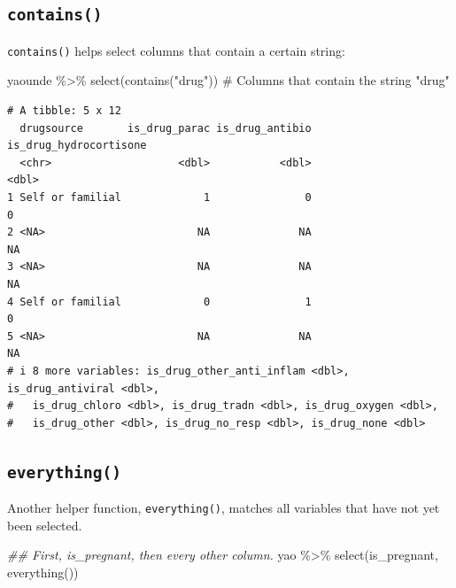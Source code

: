 \documentclass[
  letterpaper,
  DIV=11,
  numbers=noendperiod]{scrreprt}
\newenvironment{Shaded}{\begin{snugshade}}{\end{snugshade}}
\newcommand{\CommentTok}[1]{\textcolor[rgb]{0.37,0.37,0.37}{#1}}
\newcommand{\DocumentationTok}[1]{\textcolor[rgb]{0.37,0.37,0.37}{\textit{#1}}}
\newcommand{\FunctionTok}[1]{\textcolor[rgb]{0.28,0.35,0.67}{#1}}
\newcommand{\NormalTok}[1]{\textcolor[rgb]{0.00,0.23,0.31}{#1}}
\newcommand{\SpecialCharTok}[1]{\textcolor[rgb]{0.37,0.37,0.37}{#1}}
\newcommand{\StringTok}[1]{\textcolor[rgb]{0.13,0.47,0.30}{#1}}
\begin{document}
\hypertarget{contains}{%
\subsection{\texorpdfstring{\texttt{contains()}}{contains()}}\label{contains}}

\texttt{contains()} helps select columns that contain a certain string:

\begin{Shaded}
\begin{Highlighting}[]
\NormalTok{yaounde }\SpecialCharTok{\%\textgreater{}\%} \FunctionTok{select}\NormalTok{(}\FunctionTok{contains}\NormalTok{(}\StringTok{"drug"}\NormalTok{)) }\CommentTok{\# Columns that contain the string "drug"}
\end{Highlighting}
\end{Shaded}

\begin{verbatim}
# A tibble: 5 x 12
  drugsource       is_drug_parac is_drug_antibio is_drug_hydrocortisone
  <chr>                    <dbl>           <dbl>                  <dbl>
1 Self or familial             1               0                      0
2 <NA>                        NA              NA                     NA
3 <NA>                        NA              NA                     NA
4 Self or familial             0               1                      0
5 <NA>                        NA              NA                     NA
# i 8 more variables: is_drug_other_anti_inflam <dbl>, is_drug_antiviral <dbl>,
#   is_drug_chloro <dbl>, is_drug_tradn <dbl>, is_drug_oxygen <dbl>,
#   is_drug_other <dbl>, is_drug_no_resp <dbl>, is_drug_none <dbl>
\end{verbatim}

\hypertarget{everything}{%
\subsection{\texorpdfstring{\texttt{everything()}}{everything()}}\label{everything}}

Another helper function, \texttt{everything()}, matches all variables
that have not yet been selected.

\begin{Shaded}
\begin{Highlighting}[]
\DocumentationTok{\#\# First, \textasciigrave{}is\_pregnant\textasciigrave{}, then every other column.}
\NormalTok{yao }\SpecialCharTok{\%\textgreater{}\%} \FunctionTok{select}\NormalTok{(is\_pregnant, }\FunctionTok{everything}\NormalTok{())}
\end{Highlighting}
\end{Shaded}
\end{document}
